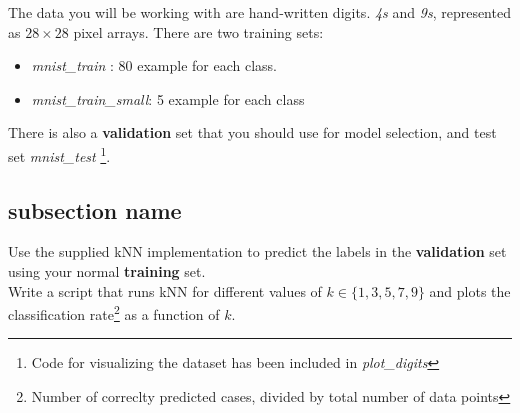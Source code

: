 \documentclass[a4paper]{tufte-handout}
\begin{document}
The data you will be working with are hand-written digits. \emph{4s} and
\emph{9s}, represented as $28\times28$ pixel arrays. There are two training
sets: 

\begin{itemize}
  \item \emph{mnist\_train} : 80 example for each class.
  \item \emph{mnist\_train\_small}: 5 example for each class
\end{itemize}

There is also a \textbf{validation} set that you should use for model selection,
and test set \emph{mnist\_test} \footnote{Code for visualizing the dataset has
been included in \emph{plot\_digits}}.\\


\subsection{subsection name}%
\label{sub:subsection_name}

Use the supplied kNN implementation to predict the labels in the
\textbf{validation} set using your normal \textbf{training} set.\\

Write a script that runs kNN for different values of $k \in\{1,3,5,7,9\}$ and
plots the classification rate\footnote{Number of correclty predicted cases,
divided by total number of data points} as a function of $k$.
\end{document}
